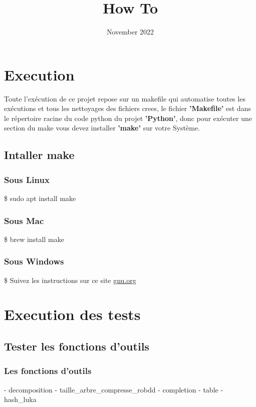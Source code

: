 \documentclass{article}
\title{How To}
\date{November 2022}
\begin{document}
\maketitle

\section{Execution}
Toute l'exécution de ce projet repose sur un makefile qui automatise toutes les exécutions et tous les nettoyages des fichiers crees, le fichier \textbf{'Makefile'} est dans le  répertoire racine du code python du projet \textbf{'Python'}, donc pour exécuter une section du make vous devez installer \textbf{'make'} sur votre Système.

\subsection{Intaller make}
\subsubsection{Sous Linux}

\tabto{1cm}\$ sudo apt install make
    
\subsubsection{Sous Mac}

\tabto{1cm}\$ brew install make

\subsubsection{Sous Windows}

\tabto{1cm}\$ Suivez les instructions sur ce site \href{https://www.gnu.org/software/make/}{gnu.org}

\section{Execution des tests}
\subsection{Tester les fonctions d'outils}
\subsubsection{Les fonctions d'outils}
\tabto{1cm} - decomposition
\tabto{1cm} - taille\_arbre\_compresse\_robdd
\tabto{1cm} - completion
\tabto{1cm} - table
\tabto{1cm} - hash\_luka
\end{document}
